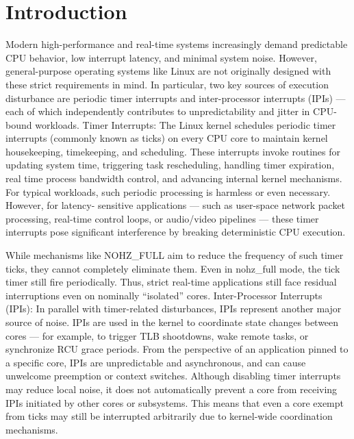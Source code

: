 \documentclass[letterpaper]{article}
\begin{document}
\section{Introduction}
Modern high-performance and real-time systems increasingly demand predictable CPU behavior,
low interrupt latency, and minimal system noise. However, general-purpose operating systems
like Linux are not originally designed with these strict requirements in mind. In particular, two key
sources of execution disturbance are periodic timer interrupts and inter-processor interrupts (IPIs)
— each of which independently contributes to unpredictability and jitter in CPU-bound workloads.
Timer Interrupts: The Linux kernel schedules periodic timer interrupts (commonly known as ticks)
on every CPU core to maintain kernel housekeeping, timekeeping, and scheduling. These
interrupts invoke routines for updating system time, triggering task rescheduling, handling timer
expiration, real time process bandwidth control, and advancing internal kernel mechanisms. For
typical workloads, such periodic processing is harmless or even necessary. However, for latency-
sensitive applications — such as user-space network packet processing, real-time control loops,
or audio/video pipelines — these timer interrupts pose significant interference by breaking
deterministic CPU execution.


While mechanisms like NOHZ\_FULL aim to reduce the frequency of such timer ticks, they cannot
completely eliminate them. Even in nohz\_full mode, the tick timer still fire periodically. Thus, strict
real-time applications still face residual interruptions even on nominally “isolated” cores.
Inter-Processor Interrupts (IPIs): In parallel with timer-related disturbances, IPIs represent another
major source of noise. IPIs are used in the kernel to coordinate state changes between cores —
for example, to trigger TLB shootdowns, wake remote tasks, or synchronize RCU grace periods.
From the perspective of an application pinned to a specific core, IPIs are unpredictable and
asynchronous, and can cause unwelcome preemption or context switches.
Although disabling timer interrupts may reduce local noise, it does not automatically prevent a
core from receiving IPIs initiated by other cores or subsystems. This means that even a core
exempt from ticks may still be interrupted arbitrarily due to kernel-wide coordination
mechanisms.
\end{document}
